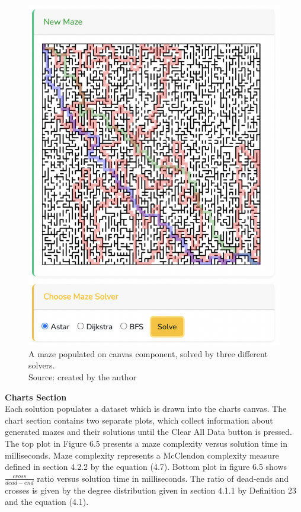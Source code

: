\begin{figure}[!h]
    \centering
    \centering
    \includegraphics[scale =0.35 ]{mazeSolutions}
    \caption{A maze populated on canvas component, solved by three different solvers.\\Source: created by the author}
    \end{figure}
\newpage
\indent \textbf{Charts Section}\\
\indent Each solution populates a dataset which is drawn into the charts canvas. The chart section contains two separate plots, which collect information about 
generated mazes and their solutions until the Clear All Data button is pressed. The top plot in Figure 6.5 presents a maze complexity versus solution time in milliseconds.
Maze complexity represents a McClendon complexity measure defined in section 4.2.2 by the equation (4.7). Bottom plot in figure 6.5 shows $\frac{cross}{dead-end}$
ratio versus solution time in milliseconds. The ratio of dead-ends and crosses is given by the degree distribution given in section 4.1.1 by Definition 23 and the equation (4.1).\\
